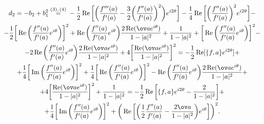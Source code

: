 \begin{multline*} 


d_2=-b_2+b^2_1\overset{(3),\,(4)}{=}{}-\frac{1}{2}\re 


\bigg[\bigg(\frac{f'''(a)}{f'(a)}-\frac{3}{2}\bigg( 


\frac{f''(a)}{f'(a)}\bigg)^2\bigg)e^{i2\theta}\bigg]- 


\frac{1}{4}\re\bigg[\bigg(\frac{f''(a)}{f'(a)}\bigg)^2 


e^{i2\theta}\bigg]- \\ 


% 


-\frac{1}{2}\bigg[\re\bigg(\frac{f''(a)}{f'(a)}e^{i\theta} 


\bigg)\bigg]^2+\re\bigg(\frac{f''(a)}{f'(a)}e^{i\theta} \bigg) 


\frac{2\re(\ov a e^{i\theta})}{1-|a|^2}+\frac{1}{1-|a|^2}+ 


\bigg[\re\bigg(\frac{f''(a)}{f'(a)}e^{i\theta}\bigg)\bigg]^2- \\ 


% 


-2\re\bigg(\frac{f''(a)}{f'(a)}e^{i\theta} \bigg) 


\frac{2\re(\ov a e^{i\theta})}{1-|a|^2}+4\bigg[


\frac{\re(\ov a e^{i\theta})}{1-|a|^2}\bigg]^2=-\frac{1}{2}\re 


[\{f,a\}e^{i2\theta}]+ \\ 


% 


+\frac{1}{4}\bigg[\im\bigg(\frac{f''(a)}{f'(a)}e^{i\theta} 


\bigg)\bigg]^2+\frac{1}{4}\bigg[\re\bigg( 


\frac{f''(a)}{f'(a)}e^{i\theta}\bigg)\bigg]^2-\re 


\bigg(\frac{f''(a)}{f'(a)}e^{i\theta} \bigg) 


\frac{2\re(\ov a e^{i\theta})}{1-|a|^2}+ \\ 


% 


+4\bigg[\frac{\re(\ov a e^{i\theta})}{1-|a|^2}\bigg]^2+ 


\frac{1}{1-|a|^2}=-\frac{1}{2}\re\bigg[\{f,a\}e^{i2\theta}- 


\frac{2}{1-|a|^2}\bigg]+ \\ 


% 


+\frac{1}{4}\bigg[\im\bigg(\frac{f''(a)}{f'(a)} 


e^{i\theta}\bigg)\bigg]^2+\bigg(\re\bigg[\bigg( 


\frac{1}{2}\frac{f''(a)}{f'(a)}-\frac{2\ov a}{1-|a|^2} 


\bigg)e^{i\theta}\bigg]\bigg)^2. 


\end{multline*} 


